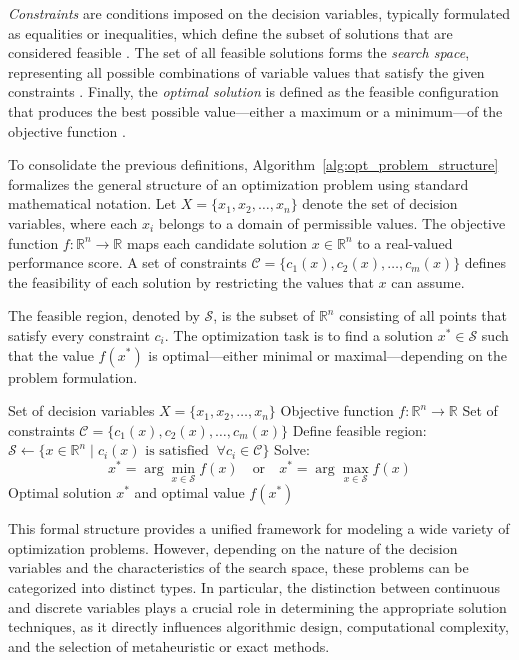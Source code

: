 \textit{Constraints} are conditions imposed on the decision variables, typically formulated as equalities or inequalities, which define the subset of solutions that are considered feasible \parencite{zheng2022review, zhan2022survey}. The set of all feasible solutions forms the \textit{search space}, representing all possible combinations of variable values that satisfy the given constraints \parencite{Khomenko2018}. Finally, the \textit{optimal solution} is defined as the feasible configuration that produces the best possible value—either a maximum or a minimum—of the objective function \parencite{carissimo2024limits}.


To consolidate the previous definitions, Algorithm~\ref{alg:opt_problem_structure} formalizes the general structure of an optimization problem using standard mathematical notation. Let $X = \{x_1, x_2, \dots, x_n\}$ denote the set of decision variables, where each $x_i$ belongs to a domain of permissible values. The objective function $f : \mathbb{R}^n \rightarrow \mathbb{R}$ maps each candidate solution $x \in \mathbb{R}^n$ to a real-valued performance score. A set of constraints $\mathcal{C} = \{c_1(x), c_2(x), \dots, c_m(x)\}$ defines the feasibility of each solution by restricting the values that $x$ can assume.

The feasible region, denoted by $\mathcal{S}$, is the subset of $\mathbb{R}^n$ consisting of all points that satisfy every constraint $c_i$. The optimization task is to find a solution $x^* \in \mathcal{S}$ such that the value $f(x^*)$ is optimal—either minimal or maximal—depending on the problem formulation.

\begin{algorithm}[H]
\caption{Formal Structure of an Optimization Problem}
\label{alg:opt_problem_structure}
\begin{algorithmic}[1]
\Require Set of decision variables $X = \{x_1, x_2, \dots, x_n\}$
\Require Objective function $f : \mathbb{R}^n \rightarrow \mathbb{R}$
\Require Set of constraints $\mathcal{C} = \{c_1(x), c_2(x), \dots, c_m(x)\}$
\State Define feasible region: $\mathcal{S} \gets \{x \in \mathbb{R}^n \mid c_i(x) \text{ is satisfied }~\forall c_i \in \mathcal{C} \}$
\State Solve:
\[
x^* = \arg\min_{x \in \mathcal{S}} f(x) \quad \text{or} \quad x^* = \arg\max_{x \in \mathcal{S}} f(x)
\]
\State \Return Optimal solution $x^*$ and optimal value $f(x^*)$
\end{algorithmic}
\end{algorithm}

This formal structure provides a unified framework for modeling a wide variety of optimization problems. However, depending on the nature of the decision variables and the characteristics of the search space, these problems can be categorized into distinct types. In particular, the distinction between continuous and discrete variables plays a crucial role in determining the appropriate solution techniques, as it directly influences algorithmic design, computational complexity, and the selection of metaheuristic or exact methods.

